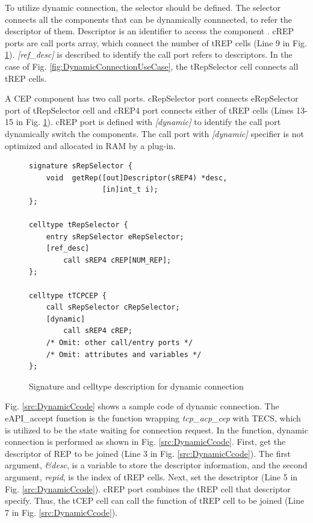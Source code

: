 \documentclass[conference]{IEEEtran/IEEEtran}
\begin{document}
To utilize dynamic connection, the selector should be defined.
The selector connects all the components that can be dynamically connnected, to refer the descriptor of them.
Descriptor is an identifier to access the component \cite{par:optimization}.
cREP ports are call ports array, which connect the number of tREP cells (Line 9 in Fig. \ref{src:DynamicCDLcode}).
{\it [ref\_desc]} is described to identify the call port refers to descriptors. 
In the case of Fig. \ref{fig:DynamicConnectionUseCase}, the tRepSelector cell connects all tREP cells.

A CEP component has two call ports.
cRepSelector port connects eRepSelector port of tRepSelector cell and cREP4 port connects either of tREP cells (Lines 13-15 in Fig. \ref{src:DynamicCDLcode}).
cREP port is defined with {\it [dynamic]} to identify the call port dynamically switch the components.
The call port with {\it [dynamic]} specifier is not optimized and allocated in RAM by a plug-in.

\begin{figure}[t]
\centering
\begin{lstlisting}
signature sRepSelector {
    void  getRep([out]Descriptor(sREP4) *desc,
                 [in]int_t i);
};

celltype tRepSelector {
    entry sRepSelector eRepSelector;
    [ref_desc]
        call sREP4 cREP[NUM_REP];
};

celltype tTCPCEP {
    call sRepSelector cRepSelector;
    [dynamic]
        call sREP4 cREP;
    /* Omit: other call/entry ports */
    /* Omit: attributes and variables */
};
\end{lstlisting}
\caption{Signature and celltype description for dynamic connection}
\label{src:DynamicCDLcode}
\end{figure}

Fig. \ref{src:DynamicCcode} shows a sample code of dynamic connection.
The eAPI\_accept function is the function wrapping {\it tcp\_acp\_cep} with TECS, which is utilized to be the state waiting for connection request.
In the function, dynamic connection is performed as shown in Fig. \ref{src:DynamicCcode}.
First, get the descriptor of REP to be joined (Line 3 in Fig. \ref{src:DynamicCcode}).
The first argument, {\it \&desc}, is a variable to store the descriptor information, and the second argument, {\it repid}, is the index of tREP cells.
Next, set the desctriptor (Line 5 in Fig. \ref{src:DynamicCcode}).
cREP port combines the tREP cell that descriptor specify.
Thus, the tCEP cell can call the function of tREP cell to be joined (Line 7 in Fig. \ref{src:DynamicCcode}).
\end{document}
